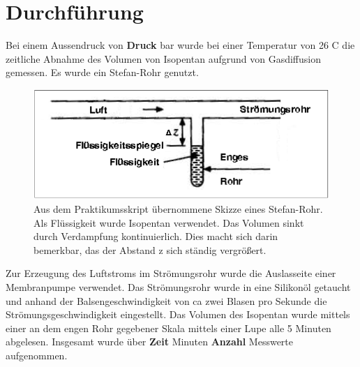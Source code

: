%
%
\section{Durchführung}
Bei einem Aussendruck von \textbf{Druck} bar wurde bei einer Temperatur von 26 \textdegree C die zeitliche Abnahme des Volumen von Isopentan aufgrund von Gasdiffusion  gemessen. Es wurde ein Stefan-Rohr genutzt. 


\begin{figure}[H]

\centering
\includegraphics[width=0.8\linewidth]{stefanrohr.png}
\caption{Aus dem Praktikumsskript übernommene Skizze eines Stefan-Rohr. Als Flüssigkeit wurde Isopentan verwendet. Das Volumen sinkt durch Verdampfung kontinuierlich. Dies macht sich darin bemerkbar, das der Abstand z sich ständig vergrößert.}
\end{figure}

Zur Erzeugung des Luftstroms im Strömungsrohr wurde die Auslasseite einer Membranpumpe verwendet. Das Strömungsrohr wurde in eine Silikonöl getaucht und anhand der  Balsengeschwindigkeit von ca zwei Blasen pro Sekunde die Strömungsgeschwindigkeit eingestellt. Das Volumen des Isopentan wurde mittels einer an dem engen Rohr gegebener Skala mittels einer Lupe alle 5 Minuten abgelesen. Insgesamt wurde über \textbf{Zeit} Minuten \textbf{Anzahl} Messwerte aufgenommen.
%
